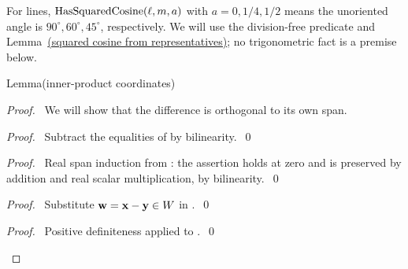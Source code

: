 \begin{mergedproofsection}
For lines, $\mathop{\mathrm{HasSquaredCosine}}\nolimits(\ell,m,a)$ with
$a=0,1/4,1/2$ means the unoriented angle is
$90^\circ,60^\circ,45^\circ$, respectively. We will use the
division-free predicate and Lemma~\hyperref[lem:312-squared-cosine]{(squared cosine from representatives)};
no trigonometric fact is a premise below.

\begin{namedresult}{Lemma}{(inner-product coordinates)}\label{lem:312-coordinates}
\end{namedresult}
\begin{proof}
\pfsketch\ We will show that the difference is orthogonal to its own span.
\begin{proof}\pf\ Subtract the equalities of  by bilinearity.~\qed\end{proof}
\begin{proof}\pf\ Real span induction from :
the assertion holds at zero and is preserved by addition and real
scalar multiplication, by bilinearity.~\qed\end{proof}
\begin{proof}\pf\ Substitute ${\mathbf w}={\mathbf x}-{\mathbf y}\in W$ in .~\qed\end{proof}
\qedstep
\begin{proof}\pf\ Positive definiteness applied to .~\qed\end{proof}
\end{proof}


\end{mergedproofsection}
